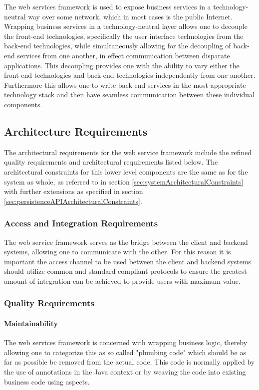 The web services framework is used to expose business services in a
technology-neutral way over some network, which in most cases is the public
Internet.  Wrapping business services in a technology-neutral layer allows
one to decouple the front-end technologies, specifically the user interface
technologies from the back-end technologies, while simultaneously allowing for the decoupling
of back-end services from one another, in effect communication between disparate
applications.  This decoupling provides one with the ability to vary either the
front-end technologies and back-end technologies independently from one
another.  Furthermore this allows one to write back-end services in the most
appropriate technology stack and then have seamless communication between these
individual components.

\subsection{Architecture Requirements}
The architectural requirements for the web service framework include the
refined quality requirements and architectural requirements listed below. The
architectural constraints for this lower level components are the same as for
the system as whole, as referred to in section \ref{sec:systemArchitecturalConstraints}
with further extensions as specified in section \ref{sec:persistenceAPIArchitecturalConstraints}.

\subsubsection{Access and Integration Requirements}
The web service framework serves as the bridge between the client and backend
systems, allowing one to communicate with the other. For this reason it is
important the access channel to be used between the client and backend systems
should utilize common and standard compliant protocols to ensure the greatest
amount of integration can be achieved to provide users with maximum value.

\subsubsection{Quality Requirements}
\paragraph{Maintainability}
\label{sec:webServicesFrameworkMaintainability}
The web services framework is concerned with wrapping business logic, thereby
allowing one to categorize this as so called "plumbing code" which should be as
far as possible be removed from the actual code. This code is normally applied
by the use of annotations in the Java context or by weaving the code into
existing business code using aspects.

